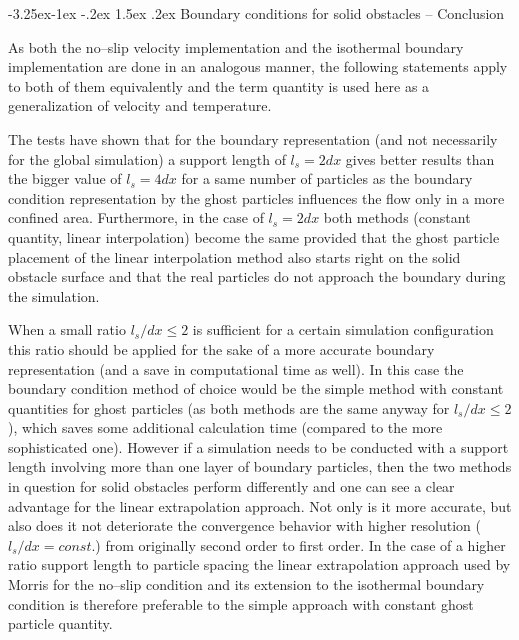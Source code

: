 \documentclass{report}
\makeatletter
\renewcommand\paragraph{\@startsection{paragraph}{4}{\z@}%
  {-3.25ex\@plus -1ex \@minus -.2ex}%
  {1.5ex \@plus .2ex}%
  {\normalfont\normalsize\bfseries}}
\makeatother
\begin{document}
\paragraph{Boundary conditions for solid obstacles -- Conclusion}
\label{sec:TestSolobs_BC_Conclusion}


As both the no--slip velocity implementation and the isothermal boundary implementation are done in an analogous manner, the following statements apply to both of them equivalently and the term quantity is used here as a generalization of velocity and temperature. 

The tests have shown that for the boundary representation (and not necessarily for the global simulation) a support length of $l_s=2dx$ gives better results than the bigger value of $l_s=4dx$ for a same number of particles as the boundary condition representation by the ghost particles influences the flow only in a more confined area. Furthermore, in the case of $l_s=2dx$ both methods (constant quantity, linear interpolation) become the same provided that the ghost particle placement of the linear interpolation method also starts right on the solid obstacle surface and that the real particles do not approach the boundary during the simulation.

When a small ratio $l_s/dx\leq2$ is sufficient for a certain simulation configuration this ratio should be applied for the sake of a more accurate boundary representation (and a save in computational time as well). In this case the boundary condition method of choice would be the simple method with constant quantities for ghost particles (as both methods are the same anyway for $l_s/dx\leq2$), which saves some additional calculation time (compared to the more sophisticated one).
However if a simulation needs to be conducted with a support length involving more than one layer of boundary particles, then the two methods in question for solid obstacles  perform differently and one can see a clear advantage for the linear extrapolation approach. Not only is it more accurate, but also does it not deteriorate the convergence behavior with higher resolution ($l_s/dx=const.$) from originally second order to first order.
In the case of a higher ratio support length to particle spacing the linear extrapolation approach used by Morris \cite{Morris1997, Zhu1999} for the no--slip condition and its extension to the isothermal boundary condition is therefore preferable to the simple approach with constant ghost particle quantity.
\end{document}
